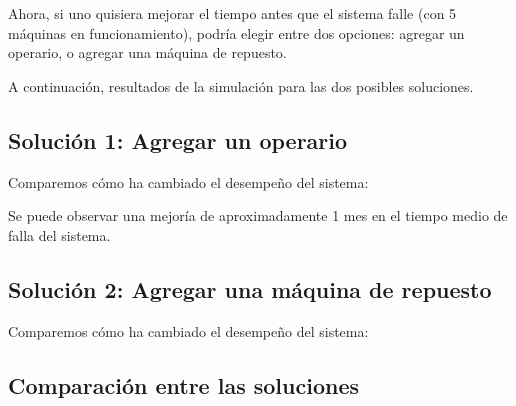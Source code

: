 \documentclass[12pt]{article}
\begin{document}
Ahora, si uno quisiera mejorar el tiempo antes que el sistema falle (con 5 máquinas en funcionamiento),
podría elegir entre dos opciones: agregar un operario, o agregar una máquina de repuesto.

A continuación, resultados de la simulación para las dos posibles soluciones.

\pagebreak

\subsection{Solución 1: Agregar un operario}

\begin{figure}[hbt]
\noindent{}
\end{figure}

Comparemos cómo ha cambiado el desempeño del sistema:

\begin{figure}[hbt]
\noindent{}
\end{figure}

Se puede observar una mejoría de aproximadamente 1 mes en el tiempo medio de falla del sistema.

\pagebreak

\subsection{Solución 2: Agregar una máquina de repuesto}

\begin{figure}[hbt]
\noindent{}
\end{figure}

Comparemos cómo ha cambiado el desempeño del sistema:

\begin{figure}[hbt]
\noindent{}
\end{figure}


\pagebreak

\subsection{Comparación entre las soluciones}

\begin{figure}[hbt]
\noindent{}
\end{figure}
\end{document}
